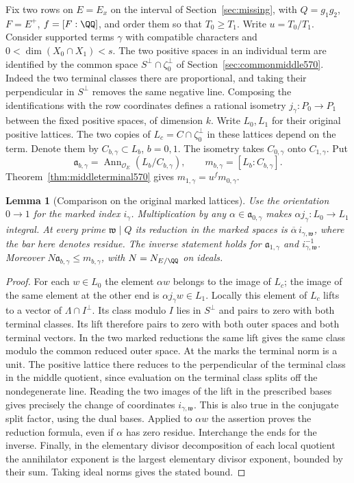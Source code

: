 \documentclass[a4paper,11pt]{article}
\newtheorem{lemma}[proposition]{Lemma}
\theoremstyle{definition}
\theoremstyle{remark}
\numberwithin{equation}{section}
\begin{document}
Fix two rows on \(E=E_x\) on the interval of
Section~\ref{sec:missing}, with \(Q=g_1g_2\), \(F=E^+\),
\(f=[F:\QQ]\), and order them so that \(T_0\ge T_1\).
Write \(u=T_0/T_1\). Consider supported terms \(\gamma\)
with compatible characters and \(0<\dim(X_0\cap X_1)<s\).
The two positive spaces in an individual term are identified
by the common space \(S^\perp\cap\zeta_0^\perp\) of
Section~\ref{sec:commonmiddle570}. Indeed the two terminal
classes there are proportional, and taking their perpendicular
in \(S^\perp\) removes the same negative line. Composing the
identifications with the row coordinates defines a rational
isometry \(j_\gamma:P_0\to P_1\) between the fixed positive
spaces, of dimension \(k\). Write \(L_0,L_1\) for their original
positive lattices. The two copies of
\(L_c=C\cap\zeta_0^\perp\) in these lattices depend on the
term. Denote them by \(C_{b,\gamma}\subset L_b\), \(b=0,1\).
The isometry takes \(C_{0,\gamma}\) onto \(C_{1,\gamma}\).
Put
\[
 \mathfrak a_{b,\gamma}
   =\operatorname{Ann}_{\mathcal O_E}(L_b/C_{b,\gamma}),
 \qquad m_{b,\gamma}=[L_b:C_{b,\gamma}].
\]
Theorem~\ref{thm:middleterminal570} gives
\(m_{1,\gamma}=u^f m_{0,\gamma}\).

\begin{lemma}[Comparison on the original marked lattices]
\leavevmode\label{lem:scaledmark576}
Use the orientation \(0\to1\) for the marked index \(i_\gamma\).
Multiplication by any \(\alpha\in\mathfrak a_{0,\gamma}\)
makes \(\alpha j_\gamma:L_0\to L_1\) integral. At every prime
\(\mathfrak w\mid Q\) its reduction in the marked spaces is
\(\overline{\alpha}\,i_{\gamma,\mathfrak w}\), where the bar
here denotes residue. The inverse statement holds for
\(\mathfrak a_{1,\gamma}\) and \(i_{\gamma,\mathfrak w}^{-1}\).
Moreover \(N\mathfrak a_{b,\gamma}\le m_{b,\gamma}\), with
\(N=N_{E/\QQ}\) on ideals.
\end{lemma}
\begin{proof}
For each \(w\in L_0\) the element \(\alpha w\) belongs to the
image of \(L_c\); the image of the same element at the other
end is \(\alpha j_\gamma w\in L_1\). Locally this element of
\(L_c\) lifts to a vector of \(\Lambda\cap I^\perp\). Its
class modulo \(I\) lies in \(S^\perp\) and pairs to zero with
both terminal classes. Its lift therefore pairs to zero with
both outer spaces and both terminal vectors. In the two
marked reductions the same lift gives the same class modulo
the common reduced outer space. At the marks the terminal
norm is a unit. The positive lattice there reduces to the
perpendicular of the terminal class in the middle quotient,
since evaluation on the terminal class splits off the
nondegenerate line. Reading the two images of the lift
in the prescribed bases gives precisely the change of
coordinates \(i_{\gamma,\mathfrak w}\). This is also true
in the conjugate split factor, using the dual bases. Applied
to \(\alpha w\) the assertion proves the reduction formula,
even if \(\alpha\) has zero residue. Interchange the ends for
the inverse. Finally, in the elementary divisor decomposition
of each local quotient the annihilator exponent is the largest
elementary divisor exponent, bounded by their sum. Taking
ideal norms gives the stated bound.
\end{proof}
\end{document}
